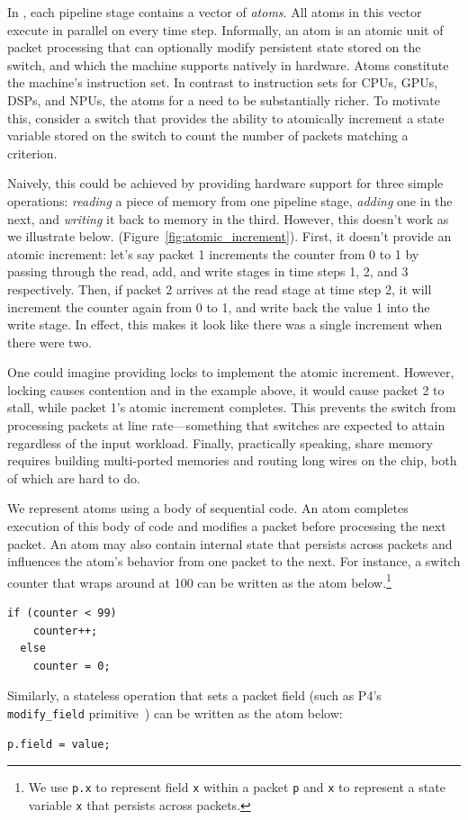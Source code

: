 In \absmachine, each pipeline stage contains a vector of \textit{atoms}. All
atoms in this vector execute in parallel on every time step.  Informally, an
atom is an atomic unit of packet processing that can optionally modify
persistent state stored on the switch, and which the \absmachine machine
supports natively in hardware. Atoms constitute the machine's instruction set.
In contrast to instruction sets for CPUs, GPUs, DSPs, and NPUs, the atoms for a
\absmachine need to be substantially richer. To motivate this, consider a
switch that provides the ability to atomically increment a state variable
stored on the switch to count the number of packets matching a criterion.

Naively, this could be achieved by providing hardware support for three simple
operations: \textit{reading} a piece of memory from one pipeline stage,
\textit{adding} one in the next, and \textit{writing} it back to memory in the
third. However, this doesn't work as we illustrate below.
(Figure~\ref{fig:atomic_increment}).  First, it doesn't provide an atomic
increment: let's say packet 1 increments the counter from 0 to 1 by passing
through the read, add, and write stages in time steps 1, 2, and 3 respectively.
Then, if packet 2 arrives at the read stage at time step 2, it will increment
the counter again from 0 to 1, and write back the value 1 into the write stage.
In effect, this makes it look like there was a single increment when there were
two.

One could imagine providing locks to implement the atomic increment. However,
locking causes contention and in the example above, it would cause packet 2 to
stall, while packet 1's atomic increment completes. This prevents the switch
from processing packets at line rate---something that switches are expected to
attain regardless of the input workload. Finally, practically speaking, share
memory requires building multi-ported memories and routing long wires on the
chip, both of which are hard to do.


We represent atoms using a body of sequential code. An atom completes execution
of this body of code and modifies a packet before processing the next packet.
An atom may also contain internal state that persists across packets and
influences the atom's behavior from one packet to the next.  For instance, a
switch counter that wraps around at 100 can be written as the atom
below.\footnote{We use {\tt p.x} to represent field {\tt x} within a packet
{\tt p} and {\tt x} to represent a state variable {\tt x} that persists across
packets.}
  \begin{lstlisting}[style=customc, numbers=none, frame=none]
  if (counter < 99)
    counter++;
  else
    counter = 0;
  \end{lstlisting}
Similarly, a stateless operation that sets a packet field (such as P4's {\tt
modify\_field} primitive~\cite{p4spec}) can be written as the atom below:
\begin{lstlisting}[style=customc, numbers=none, frame=none]
  p.field = value;
\end{lstlisting}


